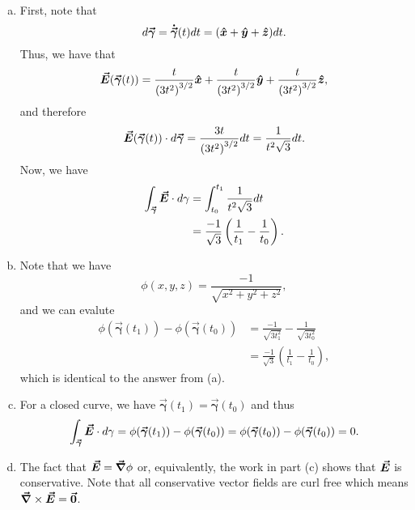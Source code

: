\documentclass[12pt]{article} %
\newcommand{\curvegamma}{\boldsymbol{\vec{\gamma}}}
\newcommand{\tangentgamma}{\boldsymbol{\dot{\vec{\gamma}}}}
\begin{document}
\begin{solution}~
\begin{enumerate}[(a)]
    \item First, note that
    \[
    d\curvegamma = \tangentgamma(t) dt = (\xhat + \yhat + \zhat)dt.
    \]
    Thus, we have that
    \[
    \vecfieldE(\curvegamma(t))= \frac{t}{\left(3t^2\right)^{3/2}} \xhat + \frac{t}{\left(3t^2\right)^{3/2}} \yhat + \frac{t}{\left(3t^2\right)^{3/2}} \zhat,
    \]
    and therefore
    \[
    \vecfieldE(\curvegamma(t)) \cdot d\curvegamma = \frac{3t}{\left(3t^2\right)^{3/2}}dt = \frac{1}{t^2\sqrt{3}}dt.
    \]
    Now, we have
    \begin{align*}
        \int_{\curvegamma} \vecfieldE \cdot d\gamma &= \int_{t_0}^{t_1} \frac{1}{t^2\sqrt{3}}dt\\
        &= \frac{-1}{\sqrt{3}}\left(\frac{1}{t_1} - \frac{1}{t_0}\right).
    \end{align*}
    \item Note that we have
    \[
    \phi(x,y,z) = \frac{-1}{\sqrt{x^2+y^2+z^2}},
    \]
    and we can evalute
    \begin{align*}
        \phi(\curvegamma(t_1))-\phi(\curvegamma(t_0)) &= \frac{-1}{\sqrt{3t_1^2}}-\frac{1}{\sqrt{3t_0^2}}\\
        &= \frac{-1}{\sqrt{3}} \left(\frac{1}{t_1}-\frac{1}{t_0}\right),
    \end{align*}
    which is identical to the answer from (a).
    \item For a closed curve, we have $\curvegamma(t_1)=\curvegamma(t_0)$ and thus
    \[
    \int_{\curvegamma} \vecfieldE \cdot d\gamma = \phi(\curvegamma(t_1))-\phi(\curvegamma(t_0)) = \phi(\curvegamma(t_0))-\phi(\curvegamma(t_0))=0.
    \]
    \item The fact that $\boldsymbol{\vec{E}} = \boldsymbol{\vec{\nabla}} \phi$ or, equivalently, the work in part (c) shows that $\boldsymbol{\vec{E}}$ is conservative. Note that all conservative vector fields are curl free which means $\boldsymbol{\vec{\nabla}} \times \boldsymbol{\vec{E}} = \boldsymbol{\vec{0}}$.
\end{enumerate}
\end{solution}
\end{document}
